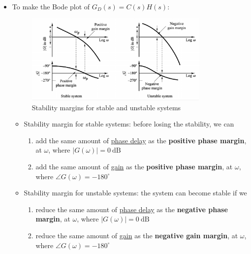 \begin{itemize}
    \item To make the Bode plot of $G_{D}(s) = C(s)H(s)$:
        \begin{figure}[H] 
            \centering
            \includegraphics[width=0.85\textwidth]{images/margin.pdf}
            \caption{Stability margins for stable and unstable systems}
        \end{figure}
        
    \begin{itemize}
        \item Stability margin for stable systems: before losing the stability, we can 
        \begin{enumerate}
            \item add the same amount of \underline{phase delay} as the \textbf{positive phase margin}, at $\omega$, where $\lvert G(\omega)\rvert=0 \ \mathrm{dB}$
            \item add the same amount of \underline{gain} as the \textbf{positive phase margin}, at $\omega$, where $\angle G(\omega)=-180^{\circ}$
        \end{enumerate}
    
        \item Stability margin for unstable systems: the system can become stable if we 
            \begin{enumerate}
                \item reduce the same amount of \underline{phase delay} as the \textbf{negative phase margin}, at $\omega$, where $\lvert G(\omega)\rvert=0 \ \mathrm{dB}$
                \item reduce the same amount of \underline{gain} as the \textbf{negative gain margin}, at $\omega$, where $\angle G(\omega)=-180^{\circ}$
            \end{enumerate}
    \end{itemize}
\end{itemize}

